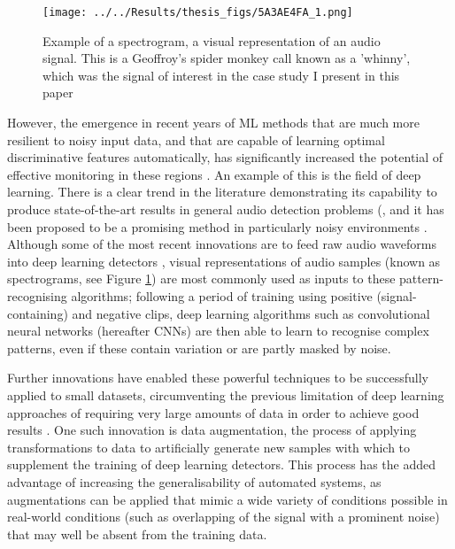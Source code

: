 \documentclass[11pt]{article}
\begin{document}
\begin{figure}[h!]
	\centering
	\texttt{[image: ../../Results/thesis\_figs/5A3AE4FA\_1.png]}
	\caption{Example of a spectrogram, a visual representation of an audio signal. This is a Geoffroy's spider monkey call known as a 'whinny', which was the signal of interest in the case study I present in this paper}
	\label{examplespect}
\end{figure}


However, the emergence in recent years of ML methods that are much more resilient to noisy input data, and that are capable of learning optimal discriminative features automatically, has significantly increased the potential of effective monitoring in these regions \citep{browning2017passive}. An example of this is the field of deep learning. There is a clear trend in the literature demonstrating its capability to produce state-of-the-art results in general audio detection problems (\citep{joly2016lifeclef,knight2017recommendations,kahl2017large}, and it has been proposed to be a promising method in particularly noisy environments \citep{browning2017passive}. Although some of the most recent innovations are to feed raw audio waveforms into deep learning detectors \citep{dai2017very}, visual representations of audio samples (known as spectrograms, see Figure \ref{examplespect}) are most commonly used as inputs to these pattern-recognising algorithms; following a period of training using positive (signal-containing) and negative clips, deep learning algorithms such as convolutional neural networks (hereafter CNNs) are then able to learn to recognise complex patterns, even if these contain variation or are partly masked by noise. 

Further innovations have enabled these powerful techniques to be successfully applied to small datasets, circumventing the previous limitation of deep learning approaches of requiring very large amounts of data in order to achieve good results \citep{kiskin2017mosquito,salamon2017deep}. One such innovation is data augmentation, the process of applying transformations to data to artificially generate new samples with which to supplement the training of deep learning detectors. This process has the added advantage of increasing the generalisability of automated systems, as augmentations can be applied that mimic a wide variety of conditions possible in real-world conditions (such as overlapping of the signal with a prominent noise) that may well be absent from the training data. 
\end{document}
